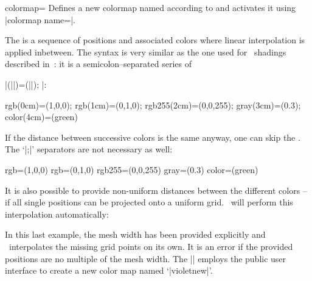 \begin{pgfplotskey}{colormap=}
	Defines a new colormap named  according to  and activates it using |colormap name=|.
	
	The  is a sequence of positions and associated colors where linear interpolation is applied inbetween. The syntax is very similar as the one used for \PGF\ shadings described in~\cite[VIII -- Shadings]{tikz}: it is a semicolon--separated series of 
	
	|(||)=(||); |:
	
\begin{codeexample}
rgb(0cm)=(1,0,0); rgb(1cm)=(0,1,0); rgb255(2cm)=(0,0,255); gray(3cm)=(0.3);  color(4cm)=(green)
\end{codeexample}

	If the distance between successive colors is the same anyway, one can skip the . The `|;|' separators are not necessary as well:

\begin{codeexample}
rgb=(1,0,0) rgb=(0,1,0) rgb255=(0,0,255) gray=(0.3) color=(green)
\end{codeexample}

	It is also possible to provide non-uniform distances between the different colors -- if all single positions can be projected onto a uniform grid. \PGFPlots\ will perform this interpolation automatically:

\begin{codeexample}[code only]
\end{codeexample}

\noindent In this last example, the mesh width has been provided explicitly and \PGFPlots\ interpolates the missing grid points on its own. It is an error if the provided positions are no multiple of the mesh width. The |\pgfplotsset| employs the public user interface to create a new color map named `|violetnew|'.


\end{pgfplotskey}
